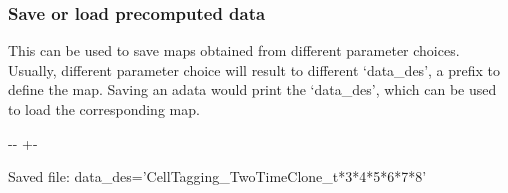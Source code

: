 \documentclass[letterpaper,10pt,english]{sphinxmanual}
\newlength\nbsphinxcodecellspacing
\begin{document}
\subsubsection{Save or load pre\sphinxhyphen{}computed data}
\label{\detokenize{20210121_reprogramming_data_merge_tags:Save-or-load-pre-computed-data}}
This can be used to save maps obtained from different parameter choices. Usually, different parameter choice will result to different ‘data\_des’, a prefix to define the map. Saving an adata would print the ‘data\_des’, which can be used to load the corresponding map.

{
\begin{sphinxVerbatim}[commandchars=\\\{\}]
\llap{\color{nbsphinxin}[13]:\,\hspace{\fboxrule}\hspace{\fboxsep}}
 

 

\end{sphinxVerbatim}
}

{

\kern-\sphinxverbatimsmallskipamount\kern-\baselineskip
\kern+\FrameHeightAdjust\kern-\fboxrule
\vspace{\nbsphinxcodecellspacing}

\begin{sphinxVerbatim}[commandchars=\\\{\}]
Saved file: data\_des='CellTagging\_TwoTimeClone\_t*3*4*5*6*7*8'
\end{sphinxVerbatim}
}
\end{document}

